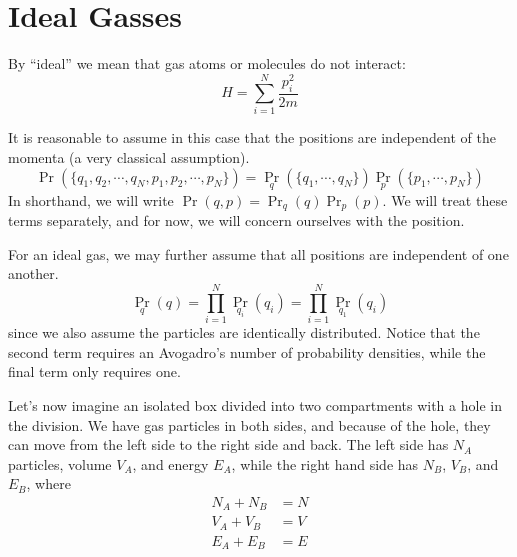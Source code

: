 \documentclass[a4paper,twoside,master.tex]{subfiles}
\begin{document}
\section{Ideal Gasses}
\label{sec:ideal_gasses}

By ``ideal'' we mean that gas atoms or molecules do not interact:
\begin{equation}
    H = \sum_{i=1}^{N} \frac{p_i^2}{2m}
\end{equation}

It is reasonable to assume in this case that the positions are independent of the momenta (a very classical assumption).
\begin{equation}
    \Pr(\{q_1, q_2,\cdots,q_N,p_1, p_2,\cdots,p_N\}) = \Pr_{q}(\{q_1, \cdots, q_N\}) \Pr_{p}(\{p_1, \cdots, p_N\})
\end{equation}
In shorthand, we will write $ \Pr(q,p) = \Pr_{q}(q) \Pr_{p}(p) $. We will treat these terms separately, and for now, we will concern ourselves with the position.

For an ideal gas, we may further assume that all positions are independent of one another.
\begin{equation}
    \Pr_{q}(q) = \prod_{i=1}^{N} \Pr_{q_i}(q_i) = \prod_{i=1}^{N} \Pr_{q_1}(q_i)
\end{equation}
since we also assume the particles are identically distributed. Notice that the second term requires an Avogadro's number of probability densities, while the final term  only requires one.

Let's now imagine an isolated box divided into two compartments with a hole in the division. We have gas particles in both sides, and because of the hole, they can move from the left side to the right side and back. The left side has $ N_A $ particles, volume $ V_A $, and energy $ E_A $, while the right hand side has $ N_B $, $ V_B $, and $ E_B $, where
\begin{align}
    N_A + N_B &= N \\
    V_A + V_B &= V \\
    E_A + E_B &= E
\end{align}
\end{document}
